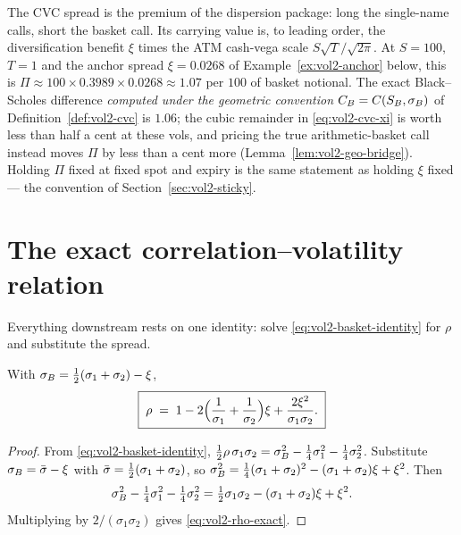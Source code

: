 \begin{remark}
\label{rem:vol2-dispersion-price}
The CVC spread is the premium of the dispersion package: long the
single-name calls, short the basket call. Its carrying value is, to leading
order, the diversification benefit $\xi$ times the ATM cash-vega scale
$S\sqrt{T}/\sqrt{2\pi}$. At $S = 100$, $T = 1$ and the anchor spread
$\xi = 0.0268$ of Example~\ref{ex:vol2-anchor} below, this is
$\Pi \approx 100 \times 0.3989 \times 0.0268 \approx 1.07$ per $100$ of
basket notional. The exact Black--Scholes difference \emph{computed under
the geometric convention} $C_B = C(S_B, \sigma_B)$ of
Definition~\ref{def:vol2-cvc} is $1.06$; the cubic remainder in
\eqref{eq:vol2-cvc-xi} is worth less than half a cent at these vols, and
pricing the true arithmetic-basket call instead moves $\Pi$ by less than a
cent more (Lemma~\ref{lem:vol2-geo-bridge}). Holding $\Pi$ fixed at fixed spot and expiry is the same
statement as holding $\xi$ fixed --- the \stickycvc{} convention of
Section~\ref{sec:vol2-sticky}.
\end{remark}

\section{The exact correlation--volatility relation}
\label{sec:vol2-exact-rho}

Everything downstream rests on one identity: solve
\eqref{eq:vol2-basket-identity} for $\rho$ and substitute the spread.

\begin{proposition}
\label{prop:vol2-exact-rho}
With $\sigma_B = \tfrac12(\sigma_1 + \sigma_2) - \xi$,
\begin{equation}
\boxed{\;\rho \;=\; 1
  - 2\Bigl(\frac{1}{\sigma_1} + \frac{1}{\sigma_2}\Bigr)\xi
  + \frac{2\xi^2}{\sigma_1\sigma_2}.\;}
\label{eq:vol2-rho-exact}
\end{equation}
\end{proposition}

\begin{proof}
From \eqref{eq:vol2-basket-identity},
$\tfrac12\rho\,\sigma_1\sigma_2 = \sigma_B^2 - \tfrac14\sigma_1^2
- \tfrac14\sigma_2^2$. Substitute $\sigma_B = \bar\sigma - \xi$ with
$\bar\sigma = \tfrac12(\sigma_1+\sigma_2)$, so
$\sigma_B^2 = \tfrac14(\sigma_1+\sigma_2)^2 - (\sigma_1+\sigma_2)\xi + \xi^2$.
Then
\[
\sigma_B^2 - \tfrac14\sigma_1^2 - \tfrac14\sigma_2^2
 = \tfrac12\sigma_1\sigma_2 - (\sigma_1+\sigma_2)\xi + \xi^2.
\]
Multiplying by $2/(\sigma_1\sigma_2)$ gives \eqref{eq:vol2-rho-exact}.
\end{proof}

